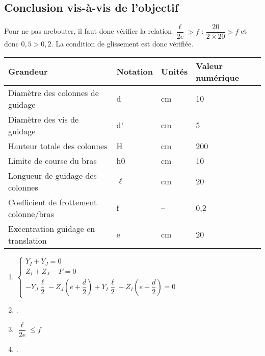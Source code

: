 \subsection*{Conclusion vis-à-vis de l'objectif}
\ifprof
\begin{corrige}
Pour ne pas arcbouter, il faut donc vérifier la relation $\dfrac{\ell}{2e} > f $ : $\dfrac{20}{2\times 20} > f $ et donc $0,5>0,2$.  La condition de glissement est donc vérifiée. 
\end{corrige}
\else
\fi



\ifprof
\else

\footnotesize
\noindent\begin{center}
\begin{tabular}{llll}
\hline
Grandeur & Notation & Unités & Valeur numérique \\ \hline
Diamètre des colonnes  de guidage & d & cm & 10 \\ 
Diamètre des vis de guidage & d' & cm & 5 \\ 
Hauteur totale des colonnes & H & cm & 200 \\ 
Limite de course du bras & h0 & cm & 10 \\ 
Longueur de guidage des colonnes & $\ell$  & cm & 20 \\ 
Coefficient de frottement colonne/bras & f & -- & 0,2 \\ 
Excentration guidage en translation & e & cm & 20 \\ \hline
\end{tabular}
\end{center}

\normalsize
\fi


\ifprof
\else

\begin{solution}
\begin{enumerate}
\item $\left\{
\begin{array}{l}
Y_I + Y_J = 0 \\
Z_I + Z_J -F = 0 \\ 
-Y_J \dfrac{\ell}{2}-Z_J \left(e+\dfrac{d}{2}\right) 
+Y_I \dfrac{\ell}{2}-Z_I \left(e-\dfrac{d}{2}\right) = 0
\end{array}
\right.$
\item .
\item $\dfrac{\ell}{2e} \leq f $
\item .
\end{enumerate} 
\end{solution}

\fi


